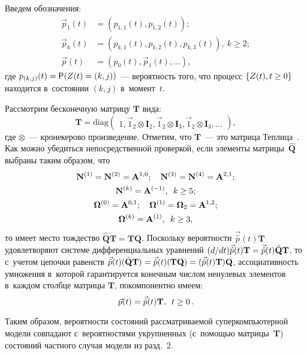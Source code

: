 \begin{multicols}{2}
Введем обозначения:
\begin{align*}
\vec{{p}}_1(t) &= \left({p}_{1,1}(t),{p}_{1,2}(t)\right);\\
\vec{{ p}}_k(t)&=({p}_{k,1}(t),{p}_{k,2}(t),{p}_{k,3}(t)),\ 
k \ge 2;\\
\vec{{ p}}(t)&=(p_0(t),\vec{{p}}_1(t),\dots),
\end{align*}
где ${p}_{(k,j)}(t)\hm=\mathsf{P}({Z}(t)=(k,j))$~---
вероятность того, что процесс $\{{Z}(t), t \hm\ge 0\}$
находится в~состоянии $(k,j)$ в~момент~$t$.

Рассмотрим бесконечную матрицу $\mathbf{T}$ вида:
$$
\mathbf{T} \!=\!
\mathrm{diag}
\begin{pmatrix}
1,
{\vec 1}_2
\otimes
\mathbf{I}_2,
{\vec 1}_2
\otimes
\mathbf{I}_3
,
{\vec 1}_2
\otimes
\mathbf{I}_3,
\dots
\end{pmatrix},
$$
где $\otimes$~--- кронекерово произведение. Отметим, что $\mathbf{T}$~--- это мат\-ри\-ца Теплица~\cite[с. 86]{gelb}.
Как можно убедиться непосредственной проверкой, если элементы матрицы~$\hat{\mathbf{Q}}$ выбраны
таким образом, что
\begin{multline}
\mathbf{N}^{(1)} = \mathbf{N}^{(2)} = \mathbf{A}^{1,0};
\quad
\mathbf{N}^{(3)} = \mathbf{N}^{(4)} = \mathbf{A}^{2,1};
\\
\mathbf{N}^{(k)} = \mathbf{A}^{(-1)},\enskip k \ge 5;
\\
{\bm {\Omega}}^{(0)} = \mathbf{A}^{0,1};
\quad
{\bm{\Omega}}^{(1)} =\bm{\Omega}_2 =  \mathbf{A}^{1,2};\\
{\bm{\Omega}}^{(k)} = \mathbf{A}^{(1)}, \enskip
 k \ge 3,
\label{para}
\end{multline}
то имеет место тождество $\hat{\mathbf{Q}} \mathbf{T}=\mathbf{T}\mathbf{Q}$.
Поскольку вероятности $\vec{\hat {p}}(t) \mathbf{T}$
удовлетворяют системе дифференциальных уравнений
$({d}/{dt}) \vec{\hat {p}}(t) \mathbf{T}\hm ={\vec{\hat {p}}}(t){\hat{\mathbf{Q}}}\mathbf{T}$,
то с~учетом цепочки равенств $\vec{\hat {p}}(t) (\hat{\mathbf{Q}} \mathbf{T})\hm=
\vec{\hat {p}}(t) (\mathbf{T}\mathbf{Q})\hm =(\vec{\hat {p}}(t) \mathbf{T})\mathbf{Q}$, ассоциативность умножения в~которой
гарантируется конечным числом ненулевых элементов в~каждом столбце матрицы $\mathbf{T}$,
покомпонентно имеем:
\begin{equation}
\label{loc}
\vec{{ p}}(t)=\vec{\hat {p}}(t) \mathbf{T}, \enskip t \ge 0\,.
\end{equation}

\noindent 
Таким образом, вероятности состояний
рассматриваемой суперкомпьютерной модели совпадают с~вероятностями
укрупненных (с~по\-мощью мат\-ри\-цы~$\mathbf{T}$) состояний
частного случая модели из разд.~2.


\end{multicols}
